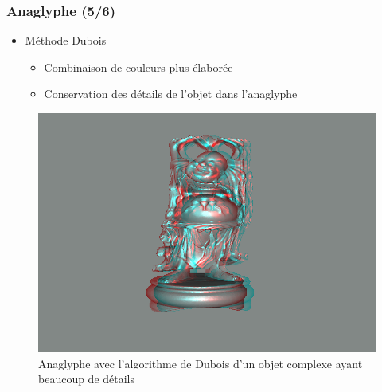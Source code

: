\documentclass{beamer}
\begin{document}
%
\begin{frame}
\frametitle{Anaglyphe (5/6)}
\begin{itemize}[label=$\bullet$]
\item Méthode Dubois \cite{algoDubois}
	\begin{itemize}[label=$\circ$]
	\item Combinaison de couleurs plus élaborée
	\item Conservation des détails de l'objet dans l'anaglyphe 
	\end{itemize}
\end{itemize}
\begin{figure}
\centering
\includegraphics[scale=0.3]{happy_dubois.png}
\caption{Anaglyphe avec l'algorithme de Dubois d'un objet complexe ayant beaucoup de détails}
\end{figure}

\end{frame}
\end{document}
